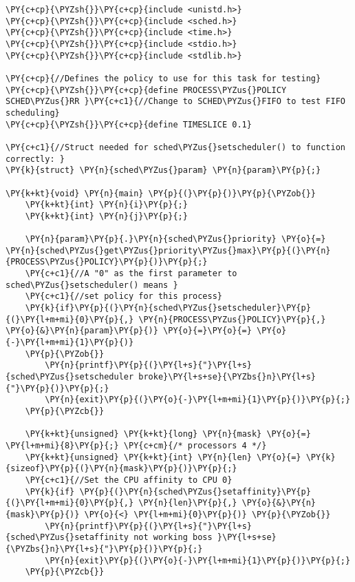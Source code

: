 \begin{Verbatim}[commandchars=\\\{\}]
\PY{c+cp}{\PYZsh{}}\PY{c+cp}{include <unistd.h>}
\PY{c+cp}{\PYZsh{}}\PY{c+cp}{include <sched.h>}
\PY{c+cp}{\PYZsh{}}\PY{c+cp}{include <time.h>}
\PY{c+cp}{\PYZsh{}}\PY{c+cp}{include <stdio.h>}
\PY{c+cp}{\PYZsh{}}\PY{c+cp}{include <stdlib.h>}

\PY{c+cp}{//Defines the policy to use for this task for testing}
\PY{c+cp}{\PYZsh{}}\PY{c+cp}{define PROCESS\PYZus{}POLICY SCHED\PYZus{}RR }\PY{c+c1}{//Change to SCHED\PYZus{}FIFO to test FIFO scheduling}
\PY{c+cp}{\PYZsh{}}\PY{c+cp}{define TIMESLICE 0.1}

\PY{c+c1}{//Struct needed for sched\PYZus{}setscheduler() to function correctly: }
\PY{k}{struct} \PY{n}{sched\PYZus{}param} \PY{n}{param}\PY{p}{;} 

\PY{k+kt}{void} \PY{n}{main} \PY{p}{(}\PY{p}{)}\PY{p}{\PYZob{}}
    \PY{k+kt}{int} \PY{n}{i}\PY{p}{;}
    \PY{k+kt}{int} \PY{n}{j}\PY{p}{;}

    \PY{n}{param}\PY{p}{.}\PY{n}{sched\PYZus{}priority} \PY{o}{=} \PY{n}{sched\PYZus{}get\PYZus{}priority\PYZus{}max}\PY{p}{(}\PY{n}{PROCESS\PYZus{}POLICY}\PY{p}{)}\PY{p}{;}
    \PY{c+c1}{//A "0" as the first parameter to sched\PYZus{}setscheduler() means }
    \PY{c+c1}{//set policy for this process}
    \PY{k}{if}\PY{p}{(}\PY{n}{sched\PYZus{}setscheduler}\PY{p}{(}\PY{l+m+mi}{0}\PY{p}{,} \PY{n}{PROCESS\PYZus{}POLICY}\PY{p}{,} \PY{o}{&}\PY{n}{param}\PY{p}{)} \PY{o}{=}\PY{o}{=} \PY{o}{-}\PY{l+m+mi}{1}\PY{p}{)}
    \PY{p}{\PYZob{}}
        \PY{n}{printf}\PY{p}{(}\PY{l+s}{"}\PY{l+s}{sched\PYZus{}setscheduler broke}\PY{l+s+se}{\PYZbs{}n}\PY{l+s}{"}\PY{p}{)}\PY{p}{;}
        \PY{n}{exit}\PY{p}{(}\PY{o}{-}\PY{l+m+mi}{1}\PY{p}{)}\PY{p}{;}
    \PY{p}{\PYZcb{}}

    \PY{k+kt}{unsigned} \PY{k+kt}{long} \PY{n}{mask} \PY{o}{=} \PY{l+m+mi}{8}\PY{p}{;} \PY{c+cm}{/* processors 4 */}
    \PY{k+kt}{unsigned} \PY{k+kt}{int} \PY{n}{len} \PY{o}{=} \PY{k}{sizeof}\PY{p}{(}\PY{n}{mask}\PY{p}{)}\PY{p}{;}
    \PY{c+c1}{//Set the CPU affinity to CPU 0}
    \PY{k}{if} \PY{p}{(}\PY{n}{sched\PYZus{}setaffinity}\PY{p}{(}\PY{l+m+mi}{0}\PY{p}{,} \PY{n}{len}\PY{p}{,} \PY{o}{&}\PY{n}{mask}\PY{p}{)} \PY{o}{<} \PY{l+m+mi}{0}\PY{p}{)} \PY{p}{\PYZob{}}
        \PY{n}{printf}\PY{p}{(}\PY{l+s}{"}\PY{l+s}{sched\PYZus{}setaffinity not working boss }\PY{l+s+se}{\PYZbs{}n}\PY{l+s}{"}\PY{p}{)}\PY{p}{;}
        \PY{n}{exit}\PY{p}{(}\PY{o}{-}\PY{l+m+mi}{1}\PY{p}{)}\PY{p}{;}
    \PY{p}{\PYZcb{}}


\end{Verbatim}
